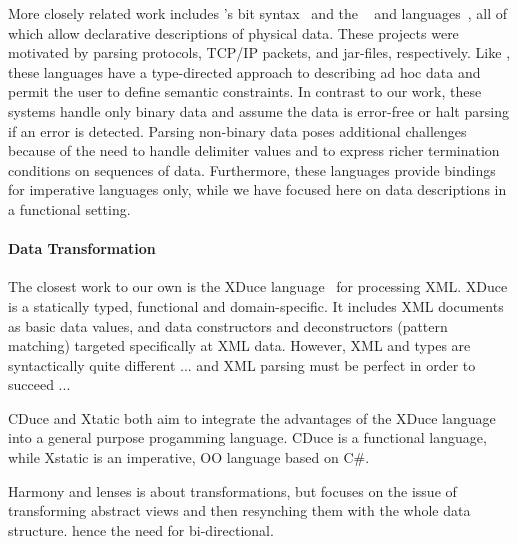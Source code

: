 More closely related work includes \erlang{}'s bit
syntax~\cite{erlang} and the \packettypes{}~\cite{sigcomm00} and
\datascript{} languages~\cite{gpce02}, all of which allow declarative
descriptions of physical data.  These projects were motivated by
parsing protocols, \textsc{TCP/IP} packets, and \java{} jar-files,
respectively.  Like \datatype{}, these languages have a type-directed
approach to describing ad hoc data and permit the user to define
semantic constraints.  In contrast to our work, these systems handle
only binary data and assume the data is error-free or halt parsing if
an error is detected.  Parsing non-binary data poses additional
challenges because of the need to handle delimiter values and to
express richer termination conditions on sequences of
data. Furthermore, these languages provide bindings for imperative
languages only, while we have focused here on data descriptions in a
functional setting.


\paragraph{Data Transformation}

The closest work to our own is the XDuce
language~\cite{hosoya+:xduce-journal} for processing {XML}. XDuce is a
statically typed, functional and domain-specific. It includes {XML}
documents as basic data values, and data constructors and
deconstructors (pattern matching) targeted specifically at {XML}
data. However, {XML} and \datatype{} types are syntactically quite
different ... and {XML} parsing must be perfect in order to succeed ...
 
CDuce and Xtatic both aim to integrate the advantages of the XDuce
language into a general purpose progamming language. CDuce is a
functional language, while Xstatic is an imperative, OO language based
on C\#.

Harmony and lenses is about transformations, but focuses on the issue
of transforming abstract views and then resynching them with the whole
data structure. hence the need for bi-directional.




